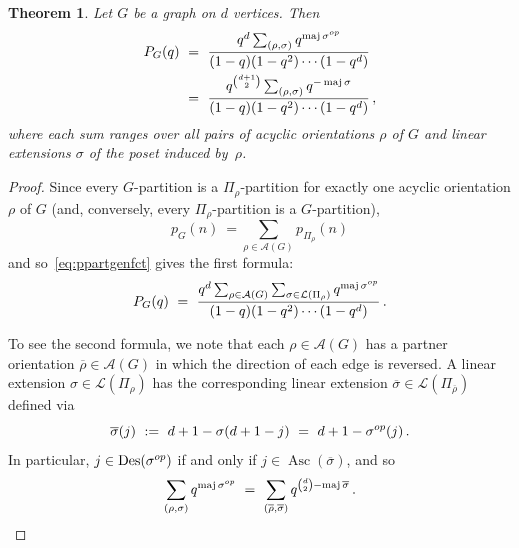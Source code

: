 \documentclass[10pt,a4paper]{amsart}
\newtheorem{theorem}{Theorem}
\newcommand\Asc{\operatorname{Asc}}
\newcommand\Des{\operatorname{Des}}
\newcommand\maj{\operatorname{maj}}
\newcommand\op{^{\rm op}}
\begin{document}
\begin{theorem}
Let $G$ be a graph on $d$ vertices. Then
\begin{align*}
  P_G(q)
  \ &= \ \frac{ q^d \sum_{(\rho,\sigma)} q^{ \maj \sigma\op } }{ (1-q) (1-q^2) \cdots (1-q^d) } \\
    &= \ \frac{ q^{ \binom{ d+1 } 2 } \sum_{(\rho,\sigma)} q^{ - \maj \sigma } }{ (1-q) (1-q^2) \cdots (1-q^d) } \, ,
\end{align*}
where each sum ranges over all pairs of acyclic orientations $\rho$ of $G$ and linear extensions $\sigma$ of the poset induced by~$\rho$.
\end{theorem}

\begin{proof}
Since every $G$-partition is a $\Pi_\rho$-partition for exactly one acyclic
orientation $\rho$ of $G$ (and, conversely, every $\Pi_\rho$-partition is a
$G$-partition),
\[
  p_G(n) \ = \sum_{\rho\in \mathcal{A}(G)} p_{ \Pi_\rho } (n)
\]
and so~\eqref{eq:ppartgenfct} gives the first formula:
\[
  P_G(q)
  \ = \ \frac{ q^d \sum_{\rho\in \mathcal{A}(G)} \sum_{ \sigma \in \mathcal{L}(\Pi_\rho) } q^{ \maj \sigma\op } }{ (1-q) (1-q^2) \cdots (1-q^d) } \, .
\]

To see the second formula, we note that each $\rho\in \mathcal{A}(G)$ has a partner
orientation $\overline\rho \in \mathcal{A}(G)$ in which the direction of each edge is
reversed. A linear extension $\sigma \in \mathcal{L}(\Pi_\rho)$ has the corresponding
linear extension $\overline\sigma \in \mathcal{L}(\Pi_{\overline\rho})$ defined via
\[
  \overline\sigma(j)
  \ := \ d+1 - \sigma(d+1-j)
  \  = \ d+1 - \sigma\op(j) \, .
\]
In particular, $j \in \Des(\sigma\op)$ if and only if $j \in \Asc(\overline\sigma)$, and so
\[
  \sum_{(\rho,\sigma)} q^{ \maj \sigma\op }
  \ = \ \sum_{(\overline\rho,\overline\sigma)} q^{ \binom d 2 - \maj \overline\sigma } \, .
\qedhere
\]
\end{proof}
\end{document}
